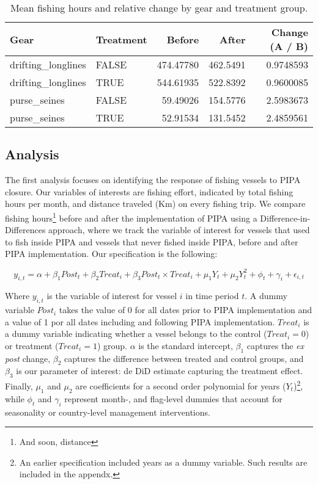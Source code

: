 \documentclass[12pt,]{article}
\let\rmarkdownfootnote\footnote%
\def\footnote{\protect\rmarkdownfootnote}
\begin{document}
\begin{table}[H]

\caption{\label{tab:unnamed-chunk-6}\label{tab:baci_h}Mean fishing hours and relative change by gear and treatment group.}
\centering
\begin{tabular}[t]{llrrr}
\toprule
Gear & Treatment & Before & After & Change (A / B)\\
\midrule
drifting\_longlines & FALSE & 474.47780 & 462.5491 & 0.9748593\\
drifting\_longlines & TRUE & 544.61935 & 522.8392 & 0.9600085\\
purse\_seines & FALSE & 59.49026 & 154.5776 & 2.5983673\\
purse\_seines & TRUE & 52.91534 & 131.5452 & 2.4859561\\
\bottomrule
\end{tabular}
\end{table}

\subsection{Analysis}\label{analysis}

The first analysis focuses on identifying the response of fishing
vessels to PIPA closure. Our variables of interests are fishing effort,
indicated by total fishing hours per month, and distance traveled (Km)
on every fishing trip. We compare fishing hours\footnote{And soon,
  distance} before and after the implementation of PIPA using a
Difference-in-Differences approach, where we track the variable of
interest for vessels that used to fish inside PIPA and vessels that
never fished inside PIPA, before and after PIPA implementation. Our
specification is the following:

\[
y_{i,t} = \alpha + \beta_1 Post_t + \beta_2 Treat_i + \beta_3 Post_t \times Treat_i + \mu_1Y_t + \mu_2Y_t^2 + \phi_t + \gamma_i + \epsilon_{i,t}
\]

Where \(y_{i,t}\) is the variable of interest for vessel \(i\) in time
period \(t\). A dummy variable \(Post_i\) takes the value of 0 for all
dates prior to PIPA implementation and a value of 1 por all dates
including and following PIPA implementation. \(Treat_i\) is a dummy
variable indicating whether a vessel belongs to the control
(\(Treat_i = 0\)) or treatment (\(Treat_i = 1\)) group. \(\alpha\) is
the standard intercept, \(\beta_1\) captures the \emph{ex post} change,
\(\beta_2\) captures the difference between treated and control groups,
and \(\beta_3\) is our parameter of interest: de DiD estimate capturing
the treatment effect. Finally, \(\mu_1\) and \(\mu_2\) are coefficients
for a second order polynomial for years (\(Y_t\))\footnote{An earlier
  specification included years as a dummy variable. Such results are
  included in the appendx.}, while \(\phi_t\) and \(\gamma_i\) represent
month-, and flag-level dummies that account for seasonality or
country-level management interventions.
\end{document}
